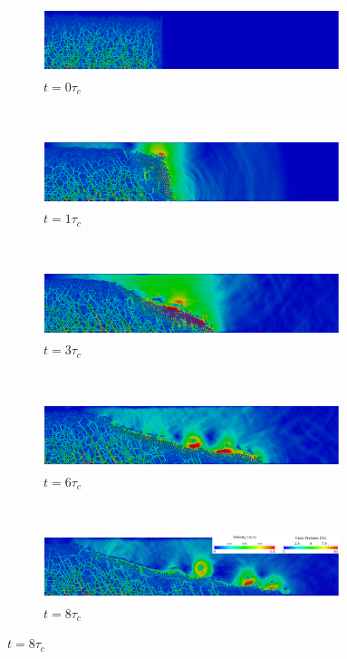 \begin{figure}
\begin{subfigure}[b]{0.95\textwidth}
	\centering
    \includegraphics[width=0.95\textwidth]{a04/a04_0}
    \caption{$t = 0\tau_c$}
    \label{fig:a04_0}
\end{subfigure}
\\
\begin{subfigure}[b]{0.95\textwidth}
	\centering
    \includegraphics[width=0.95\textwidth]{a04/a04_tc}
    \caption{$t = 1\tau_c$}
    \label{fig:a04_tc}
\end{subfigure}
\\
\begin{subfigure}[b]{0.95\textwidth}
	\centering
    \includegraphics[width=0.95\textwidth]{a04/a04_3tc}
    \caption{$t = 3\tau_c$}
    \label{fig:a04_3tc}
\end{subfigure}
\\
\begin{subfigure}[b]{0.95\textwidth}
	\centering
    \includegraphics[width=0.95\textwidth]{a04/a04_6tc}
    \caption{$t = 6\tau_c$}
    \label{fig:a04_6tc}
\end{subfigure}
\\
\begin{subfigure}[b]{0.95\textwidth}
	\centering
    \includegraphics[width=0.95\textwidth]{a04/a04_8tc}
    \caption{$t = 8\tau_c$}
    \label{fig:a04_8tc}
\end{subfigure}


\end{figure}
